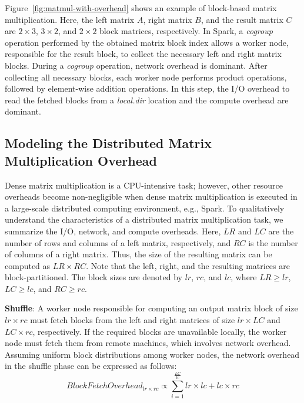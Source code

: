 \documentclass[10pt, conference, compsocconf]{IEEEtran}
\begin{document}
Figure~\ref{fig:matmul-with-overhead} shows an example of block-based matrix multiplication. Here, the left matrix $A$, right matrix $B$, and the result matrix $C$ are  $2 \times 3$,  $3 \times 2$, and $2 \times 2$ block matrices, respectively. In Spark, a \textit{cogroup} operation performed by the obtained matrix block index allows a worker node, responsible for the result block, to collect the necessary left and right matrix blocks. During a \textit{cogroup} operation, network overhead is dominant. After collecting all necessary blocks, each worker node performs product operations, followed by element-wise addition operations. In this step, the I/O overhead to read the fetched blocks from a \textit{local.dir} location and the compute overhead are dominant.

\subsection{Modeling the  Distributed Matrix Multiplication Overhead }\label{sec:overhead-modeling}
Dense matrix multiplication is a CPU-intensive task; however, other resource overheads become non-negligible when dense matrix multiplication is executed in a large-scale distributed computing environment, e.g., Spark. To qualitatively understand the characteristics of a distributed matrix multiplication task, we summarize the I/O, network, and compute overheads. Here, $LR$ and $LC$ are the number of rows and columns of a left matrix, respectively, and  $RC$ is the number of columns of a right matrix. Thus, the size of the resulting matrix can be computed as $LR \times RC$. Note that the left, right, and the resulting matrices are block-partitioned. The block sizes are denoted by $lr$, $rc$, and $lc$, where $LR \geq lr$, $LC \geq lc$, and $RC \geq rc$.

\textbf{Shuffle}: A worker node responsible for computing an output matrix block of size $lr \times rc$ must fetch blocks from the left and right matrices of size  $lr \times LC$ and $LC \times rc$, respectively. If the required blocks are unavailable locally, the worker node must fetch them from remote machines, which involves network overhead. Assuming uniform block distributions among worker nodes, the network overhead in the shuffle phase can be expressed as follows:
\begin{equation}\label{eq:shuffle-overhead}
  BlockFetchOverhead_{lr \times rc} \propto \sum\limits_{i=1}^{\frac{LC}{lc}} lr \times lc + lc \times rc
\end{equation}
\end{document}
